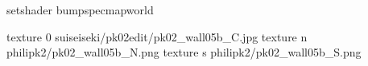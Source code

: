setshader bumpspecmapworld

texture 0 suiseiseki/pk02edit/pk02_wall05b_C.jpg
texture n philipk2/pk02_wall05b_N.png
texture s philipk2/pk02_wall05b_S.png


